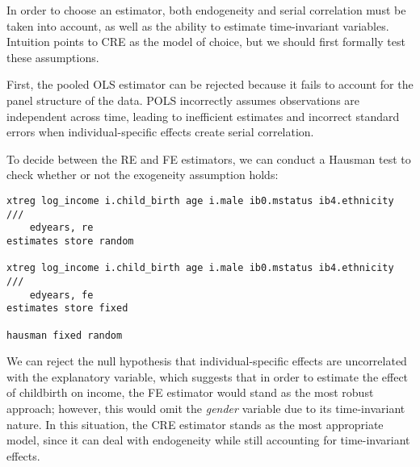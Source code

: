 


In order to choose an estimator, both endogeneity and serial correlation must be taken into account, as well as the ability to estimate time-invariant variables. Intuition points to CRE as the model of choice, but we should first formally test these assumptions.

First, the pooled OLS estimator can be rejected because it fails to account for the panel structure of the data. POLS incorrectly assumes observations are independent across time, leading to inefficient estimates and incorrect standard errors when individual-specific effects create serial correlation.

To decide between the RE and FE estimators, we can conduct a Hausman test to check whether or not the exogeneity assumption holds:

\begin{verbatim}
xtreg log_income i.child_birth age i.male ib0.mstatus ib4.ethnicity ///
    edyears, re
estimates store random

xtreg log_income i.child_birth age i.male ib0.mstatus ib4.ethnicity ///
    edyears, fe
estimates store fixed

hausman fixed random
\end{verbatim}


We can reject the null hypothesis that individual-specific effects are uncorrelated with the explanatory variable, which suggests that in order to estimate the effect of childbirth on income, the FE estimator would stand as the most robust approach; however, this would omit the \emph{gender} variable due to its time-invariant nature. In this situation, the CRE estimator stands as the most appropriate model, since it can deal with endogeneity while still accounting for time-invariant effects.

